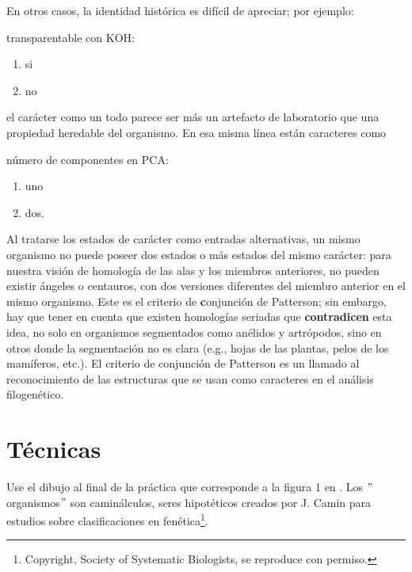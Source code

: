 En otros casos, la identidad hist\'orica es dif\'icil de apreciar; por 
ejemplo:

\begin{small}
transparentable con KOH: 
	\begin{enumerate}[start=0]
		\item si
		\item no
	\end{enumerate}	
\end{small}

el car\'acter como un todo parece ser  m\'as un artefacto de 
laboratorio que una propiedad heredable del organismo. En esa misma 
l\'inea est\'an caracteres como 

\begin{small}
n\'umero de componentes en PCA: 
	\begin{enumerate}[start=0]
		\item uno
		\item dos.
	\end{enumerate}	
\end{small}


Al tratarse los estados de car\'acter como entradas alternativas, un 
mismo organismo no puede poseer dos estados o m\'as estados del mismo 
car\'acter: para nuestra visi\'on de homolog\'ia de las alas y los 
miembros anteriores, no pueden existir \'angeles o centauros, con dos 
versiones diferentes del miembro anterior en el mismo organismo. Este 
es el criterio de {\textbf conjunci\'on} de Patterson; sin embargo, hay 
que tener en cuenta que existen homolog\'ias seriadas que 
\textbf{contradicen} esta idea, no solo en organismos segmentados como 
an\'elidos y artr\'opodos, sino en otros donde la segmentaci\'on no es 
clara (e.g., hojas de las plantas, pelos de los mam\'iferos, etc.). El 
criterio de conjunci\'on de Patterson es un llamado al reconocimiento 
de las estructuras que se usan como caracteres en el an\'alisis 
filogen\'etico.


\section*{T\'ecnicas}


Use el dibujo al final de la pr\'actica que corresponde a la figura 1 
en \cite{Sokal1983a}. Los $"$organismos$"$ son camin\'alculos, seres 
hipot\'eticos creados por J. Camin para estudios sobre clasificaciones 
en fen\'etica\footnote{Copyright, Society of Systematic Biologists, se 
reproduce con permiso.}.

